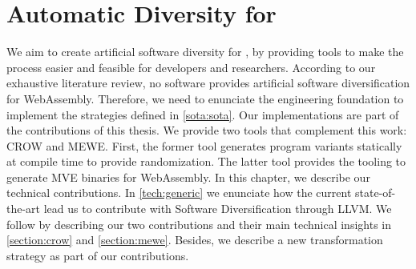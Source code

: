 \chapter{Automatic Diversity for \wasm}
\label{chapter:technical}


We aim to create artificial software diversity for \wasm, by providing tools to make the process easier and feasible for developers and researchers. According to our exhaustive literature review, no software provides artificial software diversification for WebAssembly. Therefore, we need to enunciate the engineering foundation to implement the strategies defined in \autoref{sota:sota}. Our implementations are part of the contributions of this thesis. We provide two tools that complement this work: CROW and MEWE. First, the former tool generates \wasm program variants statically at compile time to provide randomization. The latter tool provides the tooling to generate MVE binaries for WebAssembly.
In this chapter, we describe our technical contributions. In \autoref{tech:generic} we enunciate how the current state-of-the-art lead us to contribute with Software Diversification through LLVM. We follow by describing our two contributions and their main technical insights in \autoref{section:crow} and \autoref{section:mewe}. Besides, we describe a new transformation strategy as part of our contributions. 


















